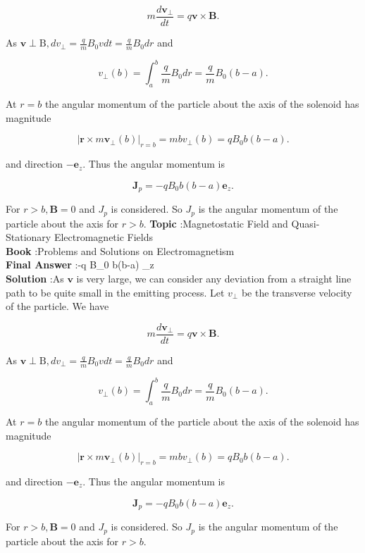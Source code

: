 \documentclass[10pt]{article}
\begin{document}
$$
m \frac{d \mathbf{v}_{\perp}}{d t}=q \mathbf{v} \times \mathbf{B} .
$$

As $\mathbf{v} \perp \mathrm{B}, d v_{\perp}=\frac{q}{m} B_{0} v d t=\frac{q}{m} B_{0} d r$ and

$$
v_{\perp}(b)=\int_{a}^{b} \frac{q}{m} B_{0} d r=\frac{q}{m} B_{0}(b-a) .
$$

At $r=b$ the angular momentum of the particle about the axis of the solenoid has magnitude

$$
\left|\mathbf{r} \times m \mathbf{v}_{\perp}(b)\right|_{r=b}=m b v_{\perp}(b)=q B_{0} b(b-a) .
$$

and direction $-\mathbf{e}_{z}$. Thus the angular momentum is

$$
\mathbf{J}_{p}=-q B_{0} b(b-a) \mathbf{e}_{z} .
$$

For $r>b, \mathbf{B}=0$ and $J_{p}$ is considered. So $J_{p}$ is the angular momentum of the particle about the axis for $r>b$.
\textbf{Topic} :Magnetostatic Field and Quasi-Stationary Electromagnetic Fields\\
\textbf{Book} :Problems and Solutions on Electromagnetism\\
\textbf{Final Answer} :-q B_{0} b(b-a) _{z}\\


\textbf{Solution} :As $\mathbf{v}$ is very large, we can consider any deviation from a straight line path to be quite small in the emitting process. Let $v_{\perp}$ be the transverse velocity of the particle. We have

$$
m \frac{d \mathbf{v}_{\perp}}{d t}=q \mathbf{v} \times \mathbf{B} .
$$

As $\mathbf{v} \perp \mathrm{B}, d v_{\perp}=\frac{q}{m} B_{0} v d t=\frac{q}{m} B_{0} d r$ and

$$
v_{\perp}(b)=\int_{a}^{b} \frac{q}{m} B_{0} d r=\frac{q}{m} B_{0}(b-a) .
$$

At $r=b$ the angular momentum of the particle about the axis of the solenoid has magnitude

$$
\left|\mathbf{r} \times m \mathbf{v}_{\perp}(b)\right|_{r=b}=m b v_{\perp}(b)=q B_{0} b(b-a) .
$$

and direction $-\mathbf{e}_{z}$. Thus the angular momentum is

$$
\mathbf{J}_{p}=-q B_{0} b(b-a) \mathbf{e}_{z} .
$$

For $r>b, \mathbf{B}=0$ and $J_{p}$ is considered. So $J_{p}$ is the angular momentum of the particle about the axis for $r>b$.
\end{document}
